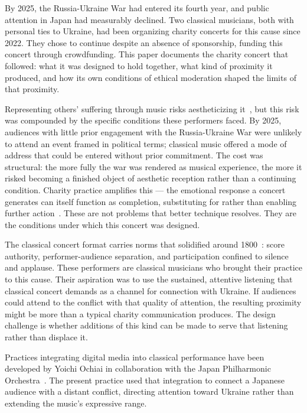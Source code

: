 \documentclass[sigconf,anonymous,review]{acmart}
\begin{document}
By 2025, the Russia-Ukraine War had entered its fourth year, and public attention in Japan had
measurably declined.
Two classical musicians, both with personal ties to Ukraine, had been
organizing charity concerts for this cause since 2022. They chose to continue despite an
absence of sponsorship, funding this concert through crowdfunding.
This paper documents the charity concert that followed: what it was designed to hold
together, what kind of proximity it produced, and how its own conditions of ethical
moderation shaped the limits of that proximity.

Representing others' suffering through music risks aestheticizing it~\cite{Sontag2003},
but this risk was compounded by the specific conditions these performers faced.
By 2025, audiences with little prior engagement with the Russia-Ukraine War were unlikely
to attend an event framed in political terms; classical music offered a mode of address
that could be entered without prior commitment.
The cost was structural: the more fully the war was rendered as musical experience, the
more it risked becoming a finished object of aesthetic reception rather than a continuing
condition.
Charity practice amplifies this — the emotional response a concert generates can itself
function as completion, substituting for rather than enabling further
action~\cite{Boltanski1999,Chouliaraki2013}.
These are not problems that better technique resolves. They are the conditions under which
this concert was designed.

The classical concert format carries norms that solidified around 1800~\cite{Goehr1992}:
score authority, performer-audience separation, and participation confined to silence and
applause.
These performers are classical musicians who brought their practice to this cause.
Their aspiration was to use the sustained, attentive listening that classical concert demands
as a channel for connection with Ukraine. If audiences could attend to the conflict with
that quality of attention, the resulting proximity might be more than a typical charity
communication produces.
The design challenge is whether additions of this kind can be made to serve that listening
rather than displace it.

Practices integrating digital media into classical performance have been developed by Yoichi
Ochiai in collaboration with the Japan Philharmonic Orchestra~\cite{Ochiai2018,Ochiai2024}.
The present practice used that integration to connect a Japanese audience with a distant
conflict, directing attention toward Ukraine rather than extending the music's expressive
range.
\end{document}
